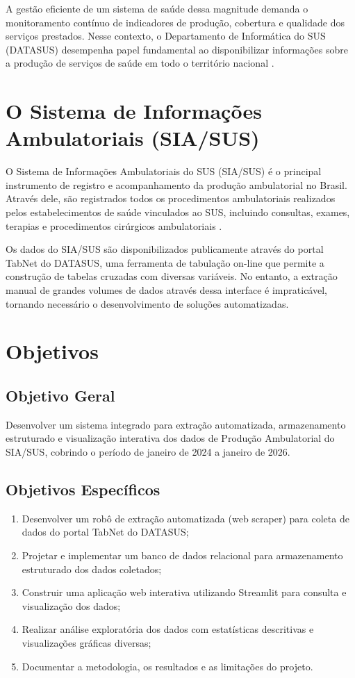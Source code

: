 \documentclass[
    12pt,
    oneside,
    a4paper,
    chapter=TITLE,
    section=TITLE
]{abntex2}
\begin{document}
A gestão eficiente de um sistema de saúde dessa magnitude demanda o monitoramento contínuo de indicadores de produção, cobertura e qualidade dos serviços prestados. Nesse contexto, o Departamento de Informática do SUS (DATASUS) desempenha papel fundamental ao disponibilizar informações sobre a produção de serviços de saúde em todo o território nacional \cite{datasus2026}.

\section{O Sistema de Informações Ambulatoriais (SIA/SUS)}

O Sistema de Informações Ambulatoriais do SUS (SIA/SUS) é o principal instrumento de registro e acompanhamento da produção ambulatorial no Brasil. Através dele, são registrados todos os procedimentos ambulatoriais realizados pelos estabelecimentos de saúde vinculados ao SUS, incluindo consultas, exames, terapias e procedimentos cirúrgicos ambulatoriais \cite{siasus2026}.

Os dados do SIA/SUS são disponibilizados publicamente através do portal TabNet do DATASUS, uma ferramenta de tabulação on-line que permite a construção de tabelas cruzadas com diversas variáveis. No entanto, a extração manual de grandes volumes de dados através dessa interface é impraticável, tornando necessário o desenvolvimento de soluções automatizadas.

\section{Objetivos}

\subsection{Objetivo Geral}

Desenvolver um sistema integrado para extração automatizada, armazenamento estruturado e visualização interativa dos dados de Produção Ambulatorial do SIA/SUS, cobrindo o período de janeiro de 2024 a janeiro de 2026.

\subsection{Objetivos Específicos}

\begin{enumerate}[label=\alph*)]
    \item Desenvolver um robô de extração automatizada (web scraper) para coleta de dados do portal TabNet do DATASUS;
    \item Projetar e implementar um banco de dados relacional para armazenamento estruturado dos dados coletados;
    \item Construir uma aplicação web interativa utilizando Streamlit para consulta e visualização dos dados;
    \item Realizar análise exploratória dos dados com estatísticas descritivas e visualizações gráficas diversas;
    \item Documentar a metodologia, os resultados e as limitações do projeto.
\end{enumerate}
\end{document}
